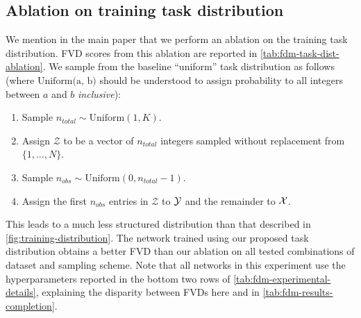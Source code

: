 \subsection{Ablation on training task distribution} \label{ap:fdm-training-task-distribution-ablation}
We mention in the main paper that we perform an ablation on the training task distribution. FVD scores from this ablation are reported in \cref{tab:fdm-task-dist-ablation}. We sample from the baseline ``uniform'' task distribution as follows (where $\text{Uniform(a, b)}$ should be understood to assign probability to all integers between $a$ and $b$ \textit{inclusive}):
\begin{enumerate}
    \item Sample $n_{total} \sim \text{Uniform}(1, K)$.
    \item Assign $\mathcal{Z}$ to be a vector of $n_{total}$ integers sampled without replacement from $\{1,\ldots,N\}$.
    \item Sample $n_{obs} \sim \text{Uniform}(0, n_{total}-1)$.
    \item Assign the first $n_{obs}$ entries in $\mathcal{Z}$ to $\mathcal{Y}$ and the remainder to $\mathcal{X}$.
\end{enumerate}
This leads to a much less structured distribution than that described in \cref{fig:training-distribution}. The network trained using our proposed task distribution obtains a better FVD than our ablation on all tested combinations of dataset and sampling scheme. Note that all networks in this experiment use the hyperparameters reported in the bottom two rows of \cref{tab:fdm-experimental-details}, explaining the disparity between FVDs here and in \cref{tab:fdm-results-completion}.
